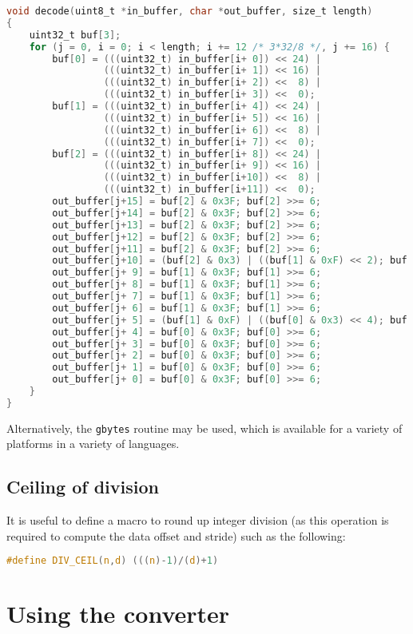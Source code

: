 \documentclass{report}
\begin{document}
\begin{lstlisting}[language=C]
void decode(uint8_t *in_buffer, char *out_buffer, size_t length)
{
	uint32_t buf[3];
	for (j = 0, i = 0; i < length; i += 12 /* 3*32/8 */, j += 16) {
		buf[0] = (((uint32_t) in_buffer[i+ 0]) << 24) |
		         (((uint32_t) in_buffer[i+ 1]) << 16) |
		         (((uint32_t) in_buffer[i+ 2]) <<  8) |
		         (((uint32_t) in_buffer[i+ 3]) <<  0);
		buf[1] = (((uint32_t) in_buffer[i+ 4]) << 24) |
		         (((uint32_t) in_buffer[i+ 5]) << 16) |
		         (((uint32_t) in_buffer[i+ 6]) <<  8) |
		         (((uint32_t) in_buffer[i+ 7]) <<  0);
		buf[2] = (((uint32_t) in_buffer[i+ 8]) << 24) |
		         (((uint32_t) in_buffer[i+ 9]) << 16) |
		         (((uint32_t) in_buffer[i+10]) <<  8) |
		         (((uint32_t) in_buffer[i+11]) <<  0);
		out_buffer[j+15] = buf[2] & 0x3F; buf[2] >>= 6;
		out_buffer[j+14] = buf[2] & 0x3F; buf[2] >>= 6;
		out_buffer[j+13] = buf[2] & 0x3F; buf[2] >>= 6;
		out_buffer[j+12] = buf[2] & 0x3F; buf[2] >>= 6;
		out_buffer[j+11] = buf[2] & 0x3F; buf[2] >>= 6;
		out_buffer[j+10] = (buf[2] & 0x3) | ((buf[1] & 0xF) << 2); buf[1] >>= 4;
		out_buffer[j+ 9] = buf[1] & 0x3F; buf[1] >>= 6;
		out_buffer[j+ 8] = buf[1] & 0x3F; buf[1] >>= 6;
		out_buffer[j+ 7] = buf[1] & 0x3F; buf[1] >>= 6;
		out_buffer[j+ 6] = buf[1] & 0x3F; buf[1] >>= 6;
		out_buffer[j+ 5] = (buf[1] & 0xF) | ((buf[0] & 0x3) << 4); buf[0] >>= 2;
		out_buffer[j+ 4] = buf[0] & 0x3F; buf[0] >>= 6;
		out_buffer[j+ 3] = buf[0] & 0x3F; buf[0] >>= 6;
		out_buffer[j+ 2] = buf[0] & 0x3F; buf[0] >>= 6;
		out_buffer[j+ 1] = buf[0] & 0x3F; buf[0] >>= 6;
		out_buffer[j+ 0] = buf[0] & 0x3F; buf[0] >>= 6;
	}
}
\end{lstlisting}

Alternatively, the \texttt{gbytes} routine may be used, which is available for a variety of platforms in a variety of languages.

\subsection{Ceiling of division}

It is useful to define a macro to round up integer division (as this operation is required to compute the data offset and stride) such as the following:

\begin{lstlisting}[language=c]
#define DIV_CEIL(n,d) (((n)-1)/(d)+1)
\end{lstlisting}

\section{Using the converter}
\end{document}
